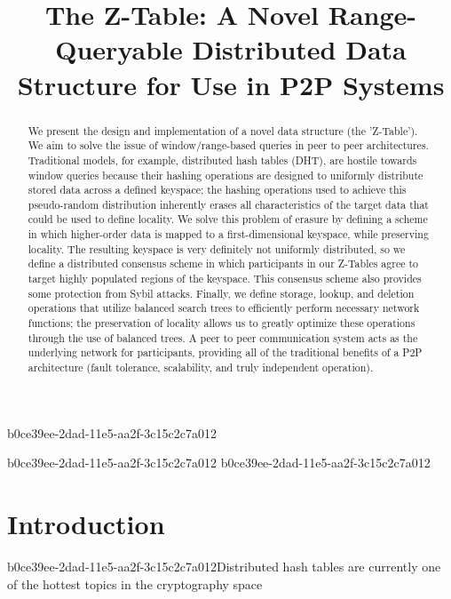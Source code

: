 \documentclass[12pt]{article}
\title{The Z-Table: A Novel Range-Queryable Distributed Data Structure for Use in P2P Systems}
\begin{document}
b0ce39ee-2dad-11e5-aa2f-3c15c2c7a012\maketitle
b0ce39ee-2dad-11e5-aa2f-3c15c2c7a012
b0ce39ee-2dad-11e5-aa2f-3c15c2c7a012\begin{abstract}
We present the design and implementation of a novel data structure (the 'Z-Table'). We aim to solve the issue of window/range-based queries in peer to peer architectures. Traditional models, for example,  distributed hash tables (DHT), are hostile towards window queries because their hashing operations are designed to uniformly distribute stored data across a defined keyspace; the hashing operations used to achieve this pseudo-random distribution inherently erases all characteristics of the target data that could be used to define locality. We solve this problem of erasure by defining a scheme in which higher-order data is mapped to a first-dimensional keyspace, while preserving locality. The resulting keyspace is very definitely not uniformly distributed, so we define a distributed consensus scheme in which participants in our Z-Tables agree to target highly populated regions of the keyspace. This consensus scheme also provides some protection from Sybil attacks. Finally, we define storage, lookup, and deletion operations that utilize balanced search trees to efficiently perform necessary network functions; the preservation of locality allows us to greatly optimize these operations through the use of balanced trees. A peer to peer communication system acts as the underlying network for participants, providing all of the traditional benefits of a P2P architecture (fault tolerance, scalability, and truly independent operation).
\end{abstract}


\newpage
\section{Introduction}
b0ce39ee-2dad-11e5-aa2f-3c15c2c7a012Distributed hash tables are currently one of the hottest topics in the cryptography space~\cite{Stoica:2001dj,Rowstron:2001ea,Ratnasamy:2001wn}

\printbibliography
\end{document}
